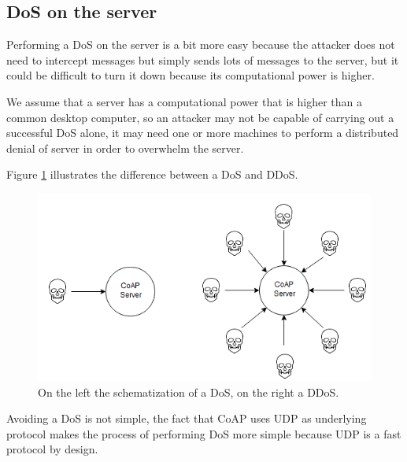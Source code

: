 	\subsection{DoS on the server}
	Performing a DoS on the server is a bit more easy because the attacker does not need to intercept messages but simply sends lots of messages to the server, but it could be difficult to turn it down because its computational power is higher.\newline
	
	We assume that a server has a computational power that is higher than a common desktop computer, so an attacker may not be capable of carrying out a successful DoS alone, it may need one or more machines to perform a distributed denial of server in order to overwhelm the server.\newline
	
	Figure \ref{fig:coap-vuln1} illustrates the difference between a DoS and DDoS.
	
	\begin{figure}
		\includegraphics[width=\linewidth]{coap-vuln-img1.png}
		\caption{On the left the schematization of a DoS, on the right a DDoS.}
		\label{fig:coap-vuln1}
	\end{figure}

	Avoiding a DoS is not simple, the fact that CoAP uses UDP as underlying protocol makes the process of performing DoS more simple because UDP is a fast protocol by design.\newline
	

